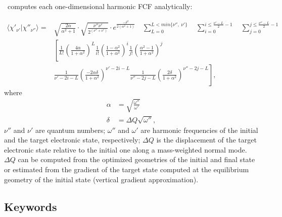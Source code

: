 \documentclass[11pt]{article}
\begin{document}
\ezFCF\ computes each one-dimensional harmonic FCF analytically\cite{FranckCondon:Math:30}:

\begin{align}
\langle\chi'_{\nu'} |\chi''_{\nu''}\rangle = &
\sqrt{\frac{2\alpha}{\alpha^2+1}}
\cdot
\sqrt{\frac{\nu''\nu'}{2^{(\nu''+\nu')}}}
\cdot
e^{\frac{-\delta^2}{2(\alpha^2+1)}} 
\quad
\sum_{L=0}^{L<min\{\nu'',\:\nu'\}} 
\quad
\sum_{i=0}^{i\le\frac{\nu'-L}{2}-1} 
\quad
\sum_{j=0}^{j\le\frac{\nu''-L}{2}-1}  \nonumber \\ 
&\left[\frac{1}{L!}\left(\frac{4\alpha}{1+\alpha^2}\right)^L
\frac{1}{i!}\left(\frac{1-\alpha^2}{1+\alpha^2}\right)^i
\frac{1}{j!}\left(\frac{\alpha^2-1}{1+\alpha^2}\right)^j \right. \nonumber\\
&\left.
\frac{1}{\nu'-2i-L}
\left(\frac{-2\alpha\delta}{1+\alpha^2}\right)^{\nu'-2i-L}
\frac{1}{\nu''-2j-L}
\left(\frac{2\delta}{1+\alpha^2}\right)^{\nu''-2j-L}\right],
\end{align}
where
\begin{align}
\alpha&=\sqrt{\frac{\omega''}{\omega'}}\nonumber\\
\delta&=\Delta Q\sqrt{\omega''},
\end{align}
$\nu''$ and $\nu'$ are quantum numbers; $\omega''$ and $\omega'$ are harmonic frequencies of the initial and the target 
electronic state, respectively; $\Delta Q$ is the displacement of the target electronic state relative to the initial one
along a mass-weighted normal mode. $\Delta Q$ can be computed from the optimized geometries of the initial and final state or estimated from the gradient of the target state computed at the equilibrium geometry
of the initial state (vertical gradient approximation).

\subsection{Keywords}
\label{sec:para:keywords}
\end{document}
